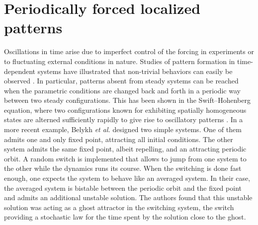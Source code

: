 \documentclass[../main/TimeForcingSHE.tex]{subfiles}
\begin{document}
\section{Periodically forced localized patterns}

Oscillations in time arise due to imperfect control of the forcing in experiments or to fluctuating external conditions in nature.
Studies of pattern formation in time-dependent systems have illustrated that non-trivial behaviors can easily be observed \cite{Vilar1997spatiotemporal,Rucklidge2009design}.
In particular, patterns absent from steady systems can be reached when the parametric conditions are changed back and forth in a periodic way between two steady configurations.
This has been shown in the Swift--Hohenberg equation, where two configurations known for exhibiting spatially homogeneous states are alterned sufficiently rapidly to give rise to oscillatory patterns \cite{buceta2001stationary}.
In a more recent example, Belykh {\it et al.} \cite{belykh2013multistable} designed two simple systems.
One of them admits one and only fixed point, attracting all initial conditions. 
The other system admits the same fixed point, albeit repelling, and an attracting periodic orbit.
A random switch is implemented that allows to jump from one system to the other while the dynamics runs its course.
When the switching is done fast enough, one expects the system to behave like an averaged system.
In their case, the averaged system is bistable between the periodic orbit and the fixed point and admits an additional unstable solution.
The authors found that this unstable solution was acting as a ghost attractor in the switching system, the switch providing a stochastic law for the time spent by the solution close to the ghost.
\end{document}
